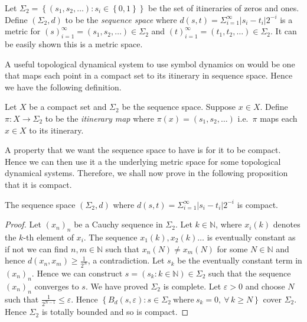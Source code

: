 \begin{defn} \label{defn:sequence-space}
    Let $\Sigma_2 = \left\lbrace (s_1, s_2, \dots): s_i \in \left\lbrace 0, 1 \right\rbrace \right\rbrace$ be the set of itineraries of zeros and ones. Define $(\Sigma_2, d)$ to be the \emph{sequence space} where $d(s, t) = \Sigma_{i=1}^{\infty}|s_i - t_i|2^{-i}$ is a metric for $(s)_{i=1}^{\infty} = (s_1, s_2, \dots) \in \Sigma_2$ and $(t)_{i=1}^{\infty} = (t_1, t_2, \dots) \in \Sigma_2$. It can be easily shown this is a metric space.
\end{defn}

A useful topological dynamical system to use symbol dynamics on would be one that maps each point in a compact set to its itinerary in sequence space. Hence we have the following definition.

\begin{defn} \label{defn:itinerary-map}
    Let $X$ be a compact set and $\Sigma_2$ be the sequence space. Suppose $x \in X$. Define $\pi : X \to \Sigma_2$ to be the \emph{itinerary map} where $\pi(x) = (s_1, s_2, \dots)$ i.e.\ $\pi$ maps each $x \in X$ to its itinerary.
\end{defn}

A property that we want the sequence space to have is for it to be compact. Hence we can then use it a the underlying metric space for some topological dynamical systems. Therefore, we shall now prove in the following proposition that it is compact.

\begin{prop}
    The sequence space $(\Sigma_2, d)$ where $d(s, t) = \Sigma_{i=1}^{\infty}|s_i - t_i|2^{-i}$ is compact.
    \begin{proof}
        Let $(x_n)_n$ be a Cauchy sequence in $\Sigma_2$. Let $k \in \mathbb{N}$, where $x_i(k)$ denotes the $k$-th element of $x_i$. The sequence $x_1(k),x_2(k)\dots$ is eventually constant as if not we can find $n, m \in \mathbb{N}$ such that $x_n(N) \neq x_m(N)$ for some $N \in \mathbb{N}$ and hence $d(x_n, x_m) \geq \frac{1}{2^N}$, a contradiction. Let $s_k$ be the eventually constant term in $(x_n)_n$. Hence we can construct $s = ( s_k : k \in \mathbb{N} ) \in \Sigma_2$ such that the sequence $(x_n)_n$ converges to $s$. We have proved $\Sigma_2$ is complete. Let $\varepsilon > 0$ and choose $N$ such that $\frac{1}{2^{N - 1}} \leq \varepsilon$. Hence $\left\lbrace B_d(s, \varepsilon) : s \in \Sigma_2 \ \text{where} \ s_k = 0, \ \forall\, k \geq N\right\rbrace$ cover $\Sigma_2$. Hence $\Sigma_2$ is totally bounded and so is compact.
    \end{proof}
\end{prop}

